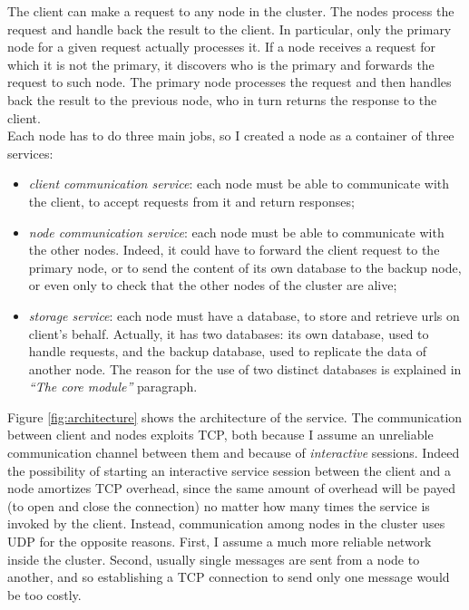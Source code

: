 \documentclass{article}
\begin{document}
The client can make a request to any node in the cluster. The nodes process the request and handle back the result to the client. In particular, only the primary node for a given request actually processes it. If a node receives a request for which it is not the primary, it discovers who is the primary and forwards the request to such node. The primary node processes the request and then handles back the result to the previous node, who in turn returns the response to the client. \\
Each node has to do three main jobs, so I created a node as a container of three services: 
\begin{itemize}
\item \textit{client communication service}: each node must be able to communicate with the client, to accept requests from it and return responses;
\item \textit{node communication service}: each node must be able to communicate with the other nodes. Indeed, it could have to forward the client request to the primary node, or to send the content of its own database to the backup node, or even only to check that the other nodes of the cluster are alive;
\item \textit{storage service}: each node must have a database, to store and retrieve urls on client's behalf. Actually, it has two databases: its own database, used to handle requests, and the backup database, used to replicate the data of another node. The reason for the use of two distinct databases is explained in \textit{``The core module''} paragraph. 
\end{itemize}
Figure \ref{fig:architecture} shows the architecture of the service. The communication between client and nodes exploits TCP, both because I assume an unreliable communication channel between them and because of \textit{interactive} sessions. Indeed the possibility of starting an interactive service session between the client and a node amortizes TCP overhead, since the same amount of overhead will be payed (to open and close the connection) no matter how many times the service is invoked by the client. Instead, communication among nodes in the cluster uses UDP for the opposite reasons. First, I assume a much more reliable network inside the cluster. Second, usually single messages are sent from a node to another, and so establishing a TCP connection to send only one message would be too costly.
\end{document}

